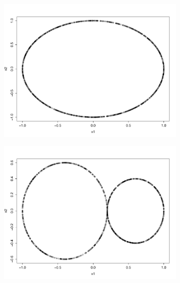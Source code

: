 \documentclass[a4paper]{article}
\begin{document}
\begin{figure}[htp!]
\centering
\begin{subfigure}{.25\textwidth}
  \centering
  \includegraphics[width=\linewidth]{sept29_1}
\end{subfigure}%
\begin{subfigure}{.25\textwidth}
  \centering
  \includegraphics[width=\linewidth]{Sept29_2}
\end{subfigure}%
\begin{subfigure}{.25\textwidth}
  \centering

\end{subfigure}
\end{figure}
\end{document}
